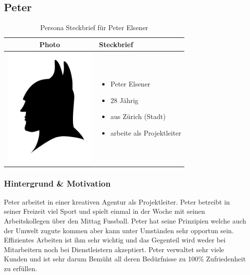 \subsection{Peter}

\begin{table}[h!]
  \centering
  \begin{tabular}{ | c | m{5cm} | }
    \hline
    Photo & Steckbrief \\ \hline
    \begin{minipage}{.3\textwidth}
      \includegraphics[width=\linewidth, height=60mm]{images/batman.jpg}
    \end{minipage}
    &
      \begin{itemize}
        \item Peter Elsener
        \item 28 Jährig
        \item aus Zürich (Stadt)
        \item arbeite als Projektleiter
      \end{itemize}
    \\ \hline
  \end{tabular}
  \caption{Persona Steckbrief für Peter Elsener}\label{tbl:steckbriefpeter}
\end{table}

\subsubsection{Hintergrund \& Motivation}
Peter arbeitet in einer kreativen Agentur als Projektleiter. Peter betreibt in seiner Freizeit viel Sport und spielt einmal in der Woche mit seinen Arbeitskollegen über den Mittag Fussball. Peter hat seine Prinzipien welche auch der Umwelt zugute kommen aber kann unter Umständen sehr opportun sein. Effizientes Arbeiten ist ihm sehr wichtig und das Gegenteil wird weder bei Mitarbeitern noch bei Dienstleistern akzeptiert. Peter verwaltet sehr viele Kunden und ist sehr darum Bemüht all deren Bedürfnisse zu 100\% Zufriedenheit zu erfüllen.

